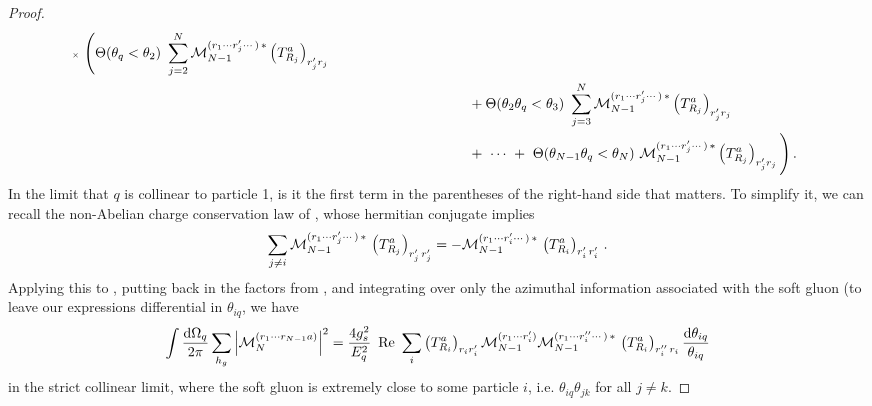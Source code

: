 \begin{proof}
\begin{align}
        \,\,\,
        {\scriptscriptstyle\times}
        \,\,
        \Bigg(
            \Theta(\theta_q < \theta_2)
            \,\,
            \sum_{j=2}^N
            \mathcal{M}_{N-1}^{(r_1\cdots r'_j \cdots )\,*}
            \left(T^a_{R_j}\right)_{r'_j r_j}
            \\
            & \notag
            \qquad\qquad\qquad\qquad\qquad
            +
            \Theta(\theta_2 \theta_q < \theta_3)
            \,\,
            \sum_{j=3}^N
            \mathcal{M}_{N-1}^{(r_1\cdots r'_j \cdots )\,*}
            \left(T^a_{R_j}\right)_{r'_j r_j}
            \\
            & \notag
            \qquad\qquad\qquad\qquad\qquad
            +
            \,\,\cdots\,\,+\,\,
            \Theta(\theta_{N-1} \theta_q < \theta_N)
            \,\,
            \mathcal{M}_{N-1}^{(r_1\cdots r'_j \cdots )\,*}
            \left(T^a_{R_j}\right)_{r'_j r_j}
        \Bigg)
        \,.
    \end{align}
    In the limit that \(q\) is collinear to particle 1, is it the first term in the parentheses of the right-hand side that matters.
    To simplify it, we can recall the non-Abelian charge conservation law of , whose hermitian conjugate implies
    \begin{align}
        \sum_{j \neq i}
        \mathcal{M}_{N-1}
        ^{(r_1\cdots r'_j\cdots )\, *}
        \,
        \le(T^a_{R_j}\ri)\indices{_{r'_j\,r'_j}}
        =
        -
        \mathcal{M}_{N-1}
        ^{(r_1\cdots r'_i\cdots )\, *}
        \,
        \le(T^a_{R_i}\ri)\indices{_{r'_i\,r'_i}}
        \,.
    \end{align}
    Applying this to , putting back in the factors from , and integrating over only the azimuthal information associated with the soft gluon (to leave our expressions differential in \(\theta_{iq}\), we have
    \begin{align}
        \int \frac{\dd\Omega_q}{2\pi}
        \sum_{h_g}
        \abs{\mathcal{M}_N^{(r_1\cdots r_{N-1}a)}}^2
        =
        \frac{4 g_s^2}{E_q^2}
        \,\,
        \Re
        \,\,
        \sum_i
        \le(T^a_{R_i}\ri)_{r_i r'_i}
        \mathcal{M}_{N-1}^{(r_1\cdots r'_i)}
        \mathcal{M}_{N-1}^{(r_1\cdots r''_i\cdots )\, *}
        \,
        \le(T^a_{R_i}\ri)\indices{_{r''_i\,r_i}}
        \frac{\dd\theta_{iq}}{\theta_{iq}}
    \end{align}
    in the strict collinear limit, where the soft gluon is extremely close to some particle \(i\), i.e. \(\theta_{iq} \theta_{jk}\) for all \(j \neq k\).



\end{proof}
